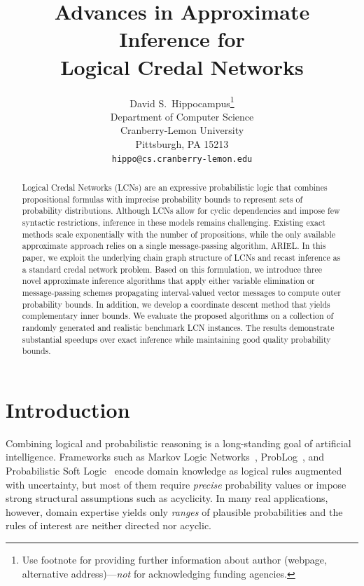 \documentclass{article}
\title{Advances in Approximate Inference for\\Logical Credal Networks}
\author{%
  David S.~Hippocampus\thanks{Use footnote for providing further information
    about author (webpage, alternative address)---\emph{not} for acknowledging
    funding agencies.} \\
  Department of Computer Science\\
  Cranberry-Lemon University\\
  Pittsburgh, PA 15213 \\
  \texttt{hippo@cs.cranberry-lemon.edu} \\
}
\begin{document}


\maketitle


\begin{abstract}
    Logical Credal Networks (LCNs) are an expressive probabilistic logic that combines propositional formulas with imprecise probability bounds to represent sets of probability distributions. Although LCNs allow for cyclic dependencies and impose few syntactic restrictions, inference in these models remains challenging. Existing exact methods scale exponentially with the number of propositions, while the only available approximate approach relies on a single message-passing algorithm, ARIEL. In this paper, we exploit the underlying chain graph structure of LCNs and recast inference as a standard credal network problem. Based on this formulation, we introduce three novel approximate inference algorithms that apply either variable elimination or message-passing schemes propagating interval-valued vector messages to compute outer probability bounds. In addition, we develop a coordinate descent method that yields complementary inner bounds. We evaluate the proposed algorithms on a collection of randomly generated and realistic benchmark LCN instances. The results demonstrate substantial speedups over exact inference while maintaining good quality probability bounds.
\end{abstract}


\section{Introduction}
\label{sec-intro}

Combining logical and probabilistic reasoning is a long-standing goal of artificial intelligence. Frameworks such as Markov Logic Networks~\cite{mln}, ProbLog~\cite{problog}, and Probabilistic Soft Logic~\cite{bach2017psl} encode domain knowledge as logical rules augmented with uncertainty, but most of them require \emph{precise} probability values or impose strong structural assumptions such as acyclicity. In many real applications, however, domain expertise yields only \emph{ranges} of plausible probabilities and the rules of interest are neither directed nor acyclic.
\end{document}
